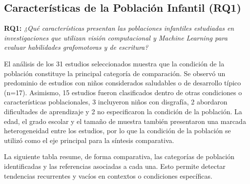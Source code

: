 \documentclass{iaesarticle}
\begin{document}
\subsection{Características de la Población Infantil (RQ1)}
\label{subsec:rq1}

\textbf{RQ1:} \textit{¿Qué características presentan las poblaciones infantiles estudiadas en investigaciones que utilizan visión computacional y Machine Learning para evaluar habilidades grafomotoras y de escritura?}

El análisis de los 31 estudios seleccionados muestra que la condición de la población constituye la principal categoría de comparación. Se observó un predominio de estudios con niños considerados saludables o de desarrollo típico (n=17). Asimismo, 15 estudios fueron clasificados dentro de otras condiciones o características poblacionales, 3 incluyeron niños con disgrafía, 2 abordaron dificultades de aprendizaje y 2 no especificaron la condición de la población. La edad, el grado escolar y el tamaño de muestra también presentaron una marcada heterogeneidad entre los estudios, por lo que la condición de la población se utilizó como el eje principal para la síntesis comparativa.

La siguiente tabla resume, de forma comparativa, las categorías de población identificadas y las referencias asociadas a cada una. Esto permite detectar tendencias recurrentes y vacíos en contextos o condiciones específicas.
\end{document}
